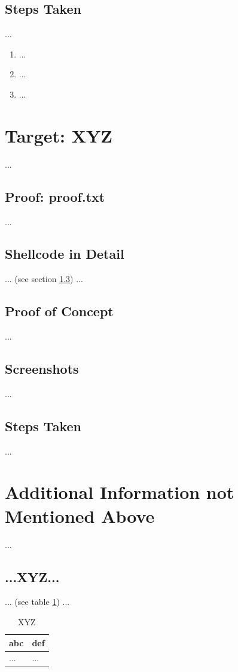 \subsection{Steps Taken}\label{osee-sec:sec2-steps}
%
...

\begin{enumerate}
    \item ...
    \item ...
    \item ...
\end{enumerate}
%
%
%
\section{Target: XYZ}\label{osee-sec:sec3}
%
...
%
%
%
\subsection{Proof: proof.txt}\label{osee-sec:sec3-proof}
%
...
%
%
%
\subsection{Shellcode in Detail}\label{osee-sec:sec3-asm}
%
... (see section \ref{osee-sec:sec3-poc}) ...
%
%
%
\subsection{Proof of Concept}\label{osee-sec:sec3-poc}
%
...
%
%
%
\subsection{Screenshots}\label{osee-sec:sec3-screens}
%
...
%
%
%
\subsection{Steps Taken}\label{osee-sec:sec3-steps}
%
...
%
%
%
\section{Additional Information not Mentioned Above}\label{osee-sec:last}
%
...
%
%
%
\subsection{...XYZ...}\label{osee-sec:last-xyz}
%
... (see table \ref{osee-tbl:last-xyz}) ...

\begin{table}[H]
    \begin{tabularx}{\textwidth}{l|l}
        \textbf{abc} & \textbf{def} \\
        \hline
        ... & ...\\
    \end{tabularx}
    \caption{XYZ\label{osee-tbl:last-xyz}}
\end{table}
%
%
%
